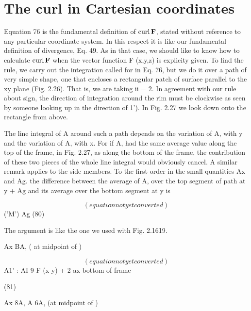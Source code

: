 \section{The curl in Cartesian coordinates}

Equation 76 is the fundamental definition of $\operatorname{curl}\mathbf{F}$, stated without
reference to any particular coordinate system. In this respect it
is like our fundamental definition of divergence, Eq. 49. As in that
case, we should like to know how to calculate $\operatorname{curl}\mathbf{F}$ when the vector
function F (x,y,z) is explicity given. To find the rule, we carry out
the integration called for in Eq. 76, but we do it over a path of very
simple shape, one that encloses a rectangular patch of surface parallel
to the xy plane (Fig. 2.26). That is, we are taking ii = 2. In
agreement with our rule about sign, the direction of integration
around the rim must be clockwise as seen by someone looking up
in the direction of 1'). In Fig. 2.27 we look down onto the rectangle
from above.

The line integral of A around such a path depends on the variation
of A, with y and the variation of A, with x. For if A, had the same
average value along the top of the frame, in Fig. 2.27, as along the
bottom of the frame, the contribution of these two pieces of the whole
line integral would obviously cancel. A similar remark applies to
the side members. To the first order in the small quantities Ax and
Ag. the difference between the average of A, over the top segment of
path at y + Ag and its average over the bottom segment at y is

\begin{equation}
(equation not yet converted)
\end{equation}
('M') Ag (80)

The argument is like the one we used with Fig. 2.1619.

Ax BA, ( at midpoint of )

\begin{equation}
(equation not yet converted)
\end{equation}
A1' : AI 9 F
(x y) + 2 ax bottom of frame

(81)

Ax 8A, A 6A, (at midpoint of )

